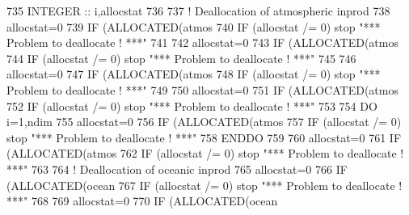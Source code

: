 \begin{DoxyCode}
735     \textcolor{keywordtype}{INTEGER} :: i,allocstat
736 
737     \textcolor{comment}{! Deallocation of atmospheric inprod}
738     allocstat=0
739     \textcolor{keywordflow}{IF} (\textcolor{keyword}{ALLOCATED}(atmos%
740     \textcolor{keywordflow}{IF} (allocstat /= 0)  stop \textcolor{stringliteral}{"*** Problem to deallocate ! ***"}
741 
742     allocstat=0
743     \textcolor{keywordflow}{IF} (\textcolor{keyword}{ALLOCATED}(atmos%
744     \textcolor{keywordflow}{IF} (allocstat /= 0)  stop \textcolor{stringliteral}{"*** Problem to deallocate ! ***"}
745 
746     allocstat=0
747     \textcolor{keywordflow}{IF} (\textcolor{keyword}{ALLOCATED}(atmos%
748     \textcolor{keywordflow}{IF} (allocstat /= 0)  stop \textcolor{stringliteral}{"*** Problem to deallocate ! ***"}
749 
750     allocstat=0
751     \textcolor{keywordflow}{IF} (\textcolor{keyword}{ALLOCATED}(atmos%
752     \textcolor{keywordflow}{IF} (allocstat /= 0)  stop \textcolor{stringliteral}{"*** Problem to deallocate ! ***"}
753 
754     \textcolor{keywordflow}{DO} i=1,ndim
755        allocstat=0
756        \textcolor{keywordflow}{IF} (\textcolor{keyword}{ALLOCATED}(atmos%
757        \textcolor{keywordflow}{IF} (allocstat /= 0)  stop \textcolor{stringliteral}{"*** Problem to deallocate ! ***"}
758 \textcolor{keywordflow}{    ENDDO}
759 
760     allocstat=0
761     \textcolor{keywordflow}{IF} (\textcolor{keyword}{ALLOCATED}(atmos%
762     \textcolor{keywordflow}{IF} (allocstat /= 0)  stop \textcolor{stringliteral}{"*** Problem to deallocate ! ***"}
763 
764     \textcolor{comment}{! Deallocation of oceanic inprod}
765     allocstat=0
766     \textcolor{keywordflow}{IF} (\textcolor{keyword}{ALLOCATED}(ocean%
767     \textcolor{keywordflow}{IF} (allocstat /= 0)  stop \textcolor{stringliteral}{"*** Problem to deallocate ! ***"}
768 
769     allocstat=0
770     \textcolor{keywordflow}{IF} (\textcolor{keyword}{ALLOCATED}(ocean%

\end{DoxyCode}

